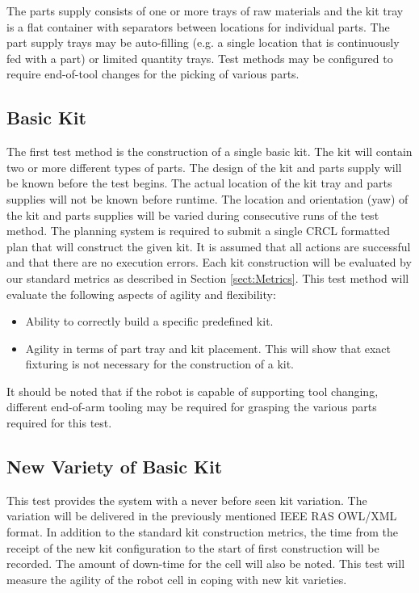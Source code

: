 The parts supply consists of one or more trays of raw materials and
the kit tray is a flat container with separators between locations for individual parts. The part supply trays may be auto-filling (e.g. 
a single location that is continuously fed with a part) or limited quantity trays. Test methods may be configured to require end-of-tool
changes for the picking of various parts.

\subsection{Basic Kit}
The first test method is the construction of a single basic kit. The kit will contain two or more different types of parts. The design of the
kit and parts supply will be known before the test begins. The actual location of the kit tray and parts supplies will not be known before
runtime. The location and orientation (yaw) of the kit and parts supplies will be varied during consecutive runs of the test method.
The planning system is required to submit a single CRCL formatted plan that will construct the given kit. It is assumed that all
actions are successful and that there are no execution errors.
Each kit construction will be evaluated by our standard metrics as described in Section \ref{sect:Metrics}. 
This test method will evaluate the following aspects of agility and flexibility:
\begin{itemize}
	\item Ability to correctly build a specific predefined kit.
	\item Agility in terms of part tray and kit placement. This will show that exact fixturing is not necessary for the construction
	of a kit.
\end{itemize}

It should be noted that if the robot is capable of supporting tool changing, different end-of-arm tooling may be required for grasping
the various parts required for this test.


\subsection{New Variety of Basic Kit}
This test provides the system with a never before seen kit variation. The variation will be delivered in the previously
mentioned IEEE RAS OWL/XML format. In addition to the standard kit construction metrics, the time from the receipt
of the new kit configuration to the start of first construction will be recorded. The amount of down-time for the
cell will also be noted. This test will measure the agility of the robot cell in coping with new kit varieties.

